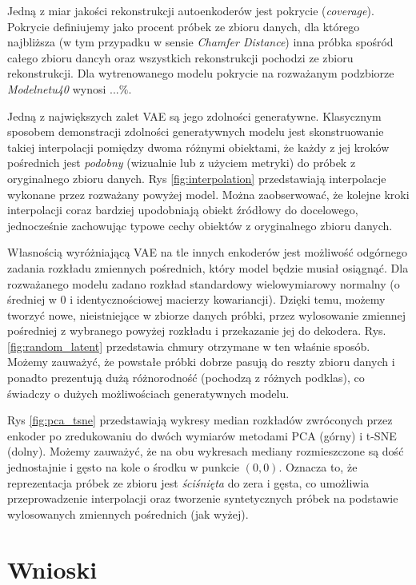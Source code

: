 \documentclass[12pt]{extarticle}
\begin{document}
Jedną z miar jakości rekonstrukcji autoenkoderów jest pokrycie (\textit{coverage}). Pokrycie definiujemy jako procent
próbek ze zbioru danych, dla którego najbliższa (w tym przypadku w sensie \textit{Chamfer Distance}) inna próbka
spośród całego zbioru dancyh oraz wszystkich rekonstrukcji pochodzi ze zbioru rekonstrukcji.
Dla wytrenowanego modelu pokrycie na rozważanym podzbiorze \textit{Modelnetu40} wynosi $...\%$.

Jedną z największych zalet VAE są jego zdolności generatywne. Klasycznym sposobem demonstracji zdolności generatywnych
modelu jest skonstruowanie takiej interpolacji pomiędzy dwoma różnymi obiektami, że każdy z jej kroków pośrednich
jest \textit{podobny} (wizualnie lub z użyciem metryki) do próbek z oryginalnego zbioru danych. Rys \ref{fig:interpolation}
przedstawiają interpolacje wykonane przez rozważany powyżej model. Można zaobserwować, że kolejne kroki interpolacji
coraz bardziej upodobniają obiekt źródłowy do docelowego, jednocześnie zachowując typowe cechy obiektów z oryginalnego
zbioru danych.

Własnością wyróżniającą VAE na tle innych enkoderów jest możliwość odgórnego zadania rozkładu zmiennych pośrednich,
który model będzie musiał osiągnąć. Dla rozważanego modelu zadano rozkład standardowy wielowymiarowy normalny
(o średniej w 0 i identycznościowej macierzy kowariancji). Dzięki temu, możemy tworzyć nowe, nieistniejące w zbiorze
danych próbki, przez wylosowanie zmiennej pośredniej z wybranego powyżej rozkładu i przekazanie jej do dekodera.
Rys. \ref{fig:random_latent} przedstawia chmury otrzymane w ten właśnie sposób. Możemy zauważyć, że powstałe
próbki dobrze pasują do reszty zbioru danych i ponadto prezentują dużą różnorodność (pochodzą z różnych podklas),
co świadczy o dużych możliwościach generatywnych modelu.

Rys \ref{fig:pca_tsne} przedstawiają wykresy median rozkładów zwróconych przez enkoder po zredukowaniu
do dwóch wymiarów metodami PCA (górny) i t-SNE (dolny). Możemy zauważyć, że na obu wykresach mediany rozmieszczone
są dość jednostajnie i gęsto na kole o środku w punkcie $(0, 0)$. Oznacza to, że reprezentacja próbek ze zbioru jest
\textit{ściśnięta} do zera i gęsta, co umożliwia przeprowadzenie interpolacji oraz tworzenie syntetycznych próbek
na podstawie wylosowanych zmiennych pośrednich (jak wyżej).

\section{Wnioski}



\end{document}
